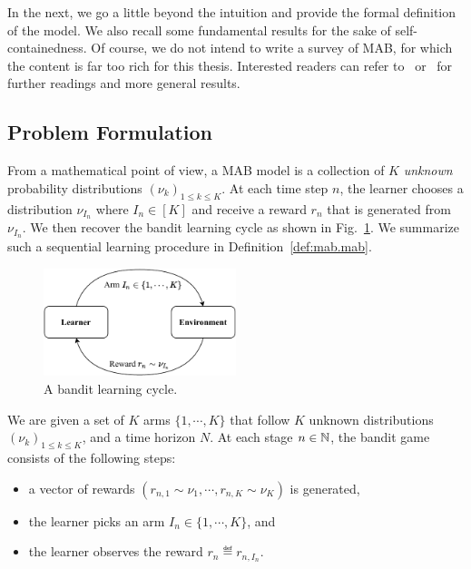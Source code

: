 In the next, we go a little beyond the intuition and provide the formal definition of the model. We also recall some fundamental results for the sake of self-containedness. Of course, we do not intend to write a survey of MAB, for which the content is far too rich for this thesis. Interested readers can refer to~\cite{bubeck2012bandits,lattimore2018bandits} or~\cite{slivkins2019bandits} for further readings and more general results.

\subsection{Problem Formulation}\label{sec:mab.model.formulation}

From a mathematical point of view, a MAB model is a collection of $K$ \emph{unknown} probability distributions $(\nu_k)_{1 \leq k \leq K}$. At each time step $n$, the learner chooses a distribution $\nu_{I_n}$ where $I_n\in[K]$ and receive a reward $r_n$ that is generated from $\nu_{I_n}$. We then recover the bandit learning cycle as shown in Fig.~\ref{fig:mab.mab}. We summarize such a sequential learning procedure in Definition~\ref{def:mab.mab}.

\begin{figure}[ht]
    \centering
    \includegraphics[width=0.5\textwidth]{Chapter2/img/mab_bis.pdf}
    \caption{A bandit learning cycle.}
    \label{fig:mab.mab}
\end{figure}

\begin{definition}\label{def:mab.mab}
\begin{leftbar}[defnbar]
	We are given a set of $K$ arms $\{1,\cdots,K\}$ that follow $K$ unknown distributions $(\nu_k)_{1 \leq k \leq K}$, and a time horizon $N$. At each stage $n\in{\mathbb N}$, the bandit game consists of the following steps:
	\begin{itemize}
		\item a vector of rewards $(r_{n,1} \sim \nu_1, \cdots, r_{n,K} \sim \nu_K)$ is generated,
		\item the learner picks an arm $I_n \in \{1,\cdots,K\}$, and
		\item the learner observes the reward $r_n \eqdef r_{n,I_n}$.
	\end{itemize}
\end{leftbar}
\end{definition}

